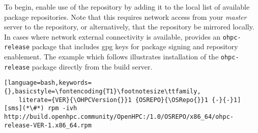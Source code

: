 To begin, enable use of the \OHPC{} repository by adding it to the local list
of available package repositories. Note that this requires network access from
your {\em master} server to the \OHPC{} repository, or alternatively, that
the \OHPC{} repository be mirrored locally.  In cases where network external
connectivity is available, \OHPC{} provides an \texttt{ohpc-release} package
that includes gpg keys for package signing and repository enablement.  The
example which follows illustrates installation of the \texttt{ohpc-release}
package directly from the \OHPC{} build server.


\begin{lstlisting}[language=bash,keywords={},basicstyle=\fontencoding{T1}\footnotesize\ttfamily,
	literate={VER}{\OHPCVersion{}}1 {OSREPO}{\OSRepo{}}1 {-}{-}1]
[sms](*\#*) rpm -ivh http://build.openhpc.community/OpenHPC:/1.0/OSREPO/x86_64/ohpc-release-VER-1.x86_64.rpm
\end{lstlisting}







